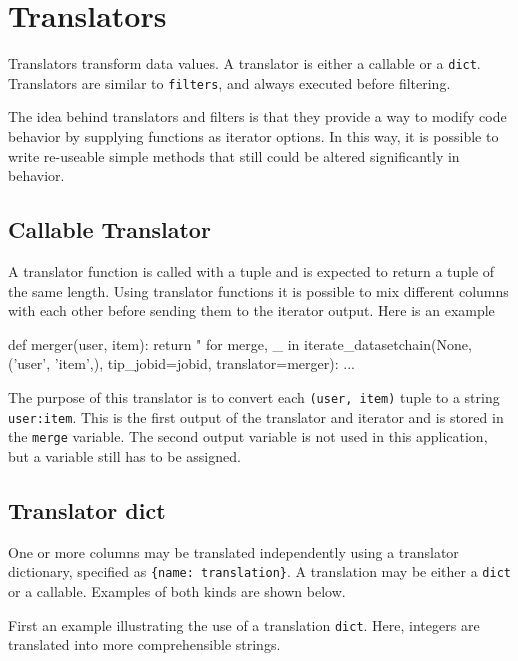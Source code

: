 \section{Translators}

Translators transform data values. A translator is either a callable or
a \texttt{dict}.  Translators are similar to \texttt{filters}, and
always executed before filtering.

The idea behind translators and filters is that they provide a way to
modify code behavior by supplying functions as iterator options.  In
this way, it is possible to write re-useable simple methods that still
could be altered significantly in behavior.



\subsection*{Callable Translator}

A translator function is called with a tuple and is expected to return
a tuple of the same length.  Using translator functions it is possible
to mix different columns with each other before sending them to the
iterator output.  Here is an example

\begin{python}
def merger(user, item):
    return "%
for merge, _ in iterate_datasetchain(None, ('user', 'item',), tip_jobid=jobid,
                                     translator=merger):
    ...
\end{python}
The purpose of this translator is to convert each
\texttt{(user, item)} tuple to a string \texttt{user:item}.  This is
the first output of the translator and iterator and is stored in the
\texttt{merge} variable.  The second output variable is not used in
this application, but a variable still has to be assigned.



\subsection*{Translator dict}

One or more columns may be translated independently using a translator
dictionary, specified as \texttt{\{name:\ translation\}}.  A
translation may be either a \texttt{dict} or a callable.  Examples of
both kinds are shown below.

First an example illustrating the use of a translation \texttt{dict}.
Here, integers are translated into more comprehensible strings.


